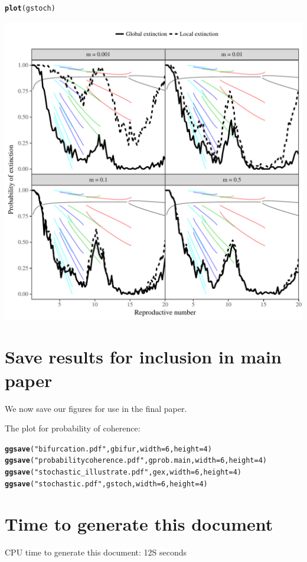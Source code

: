 \documentclass[12pt]{article}\usepackage[]{graphicx}\usepackage[]{color}
\makeatletter
\def\maxwidth{ %
  \ifdim\Gin@nat@width>\linewidth
    \linewidth
  \else
    \Gin@nat@width
  \fi
}
\newcommand{\hlnum}[1]{\textcolor[rgb]{0.686,0.059,0.569}{#1}}%
\newcommand{\hlstr}[1]{\textcolor[rgb]{0.192,0.494,0.8}{#1}}%
\newcommand{\hlstd}[1]{\textcolor[rgb]{0.345,0.345,0.345}{#1}}%
\newcommand{\hlkwc}[1]{\textcolor[rgb]{0.333,0.667,0.333}{#1}}%
\newcommand{\hlkwd}[1]{\textcolor[rgb]{0.737,0.353,0.396}{\textbf{#1}}}%
\newenvironment{kframe}{%
 \def\at@end@of@kframe{}%
 \ifinner\ifhmode%
  \def\at@end@of@kframe{\end{minipage}}%
  \begin{minipage}{\columnwidth}%
 \fi\fi%
 \def\FrameCommand##1{\hskip\@totalleftmargin \hskip-\fboxsep
 \colorbox{shadecolor}{##1}\hskip-\fboxsep
     \hskip-\linewidth \hskip-\@totalleftmargin \hskip\columnwidth}%
 \MakeFramed {\advance\hsize-\width
   \@totalleftmargin\z@ \linewidth\hsize
   \@setminipage}}%
 {\par\unskip\endMakeFramed%
 \at@end@of@kframe}
\newenvironment{knitrout}{}{} %
\makeatother
\begin{document}
\begin{knitrout}
\begin{kframe}
\begin{alltt}
\hlkwd{plot}\hlstd{(gstoch)}
\end{alltt}
\end{kframe}
\includegraphics[width=\maxwidth]{figure/unnamed-chunk-7-1} 

\end{knitrout}

\section{Save results for inclusion in main paper}

We now save our figures for use in the final paper.

The plot for probability of coherence:
\begin{knitrout}
\color{fgcolor}\begin{kframe}
\begin{alltt}
\hlkwd{ggsave}\hlstd{(}\hlstr{"bifurcation.pdf"}\hlstd{, gbifur,} \hlkwc{width}\hlstd{=}\hlnum{6}\hlstd{,} \hlkwc{height}\hlstd{=}\hlnum{4}\hlstd{)}
\hlkwd{ggsave}\hlstd{(}\hlstr{"probabilitycoherence.pdf"}\hlstd{, gprob.main,} \hlkwc{width}\hlstd{=}\hlnum{6}\hlstd{,} \hlkwc{height} \hlstd{=} \hlnum{4}\hlstd{)}
\hlkwd{ggsave}\hlstd{(}\hlstr{"stochastic_illustrate.pdf"}\hlstd{, gex,} \hlkwc{width}\hlstd{=}\hlnum{6}\hlstd{,} \hlkwc{height}\hlstd{=}\hlnum{4}\hlstd{)}
\hlkwd{ggsave}\hlstd{(}\hlstr{"stochastic.pdf"}\hlstd{, gstoch,} \hlkwc{width}\hlstd{=}\hlnum{6}\hlstd{,} \hlkwc{height}\hlstd{=}\hlnum{4}\hlstd{)}
\end{alltt}
\end{kframe}
\end{knitrout}

\section{Time to generate this document}



CPU time to generate this document: 12S seconds
\end{document}
